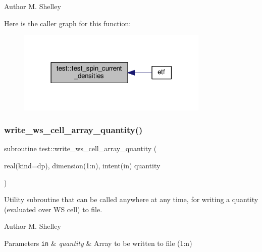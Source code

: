 \begin{DoxyAuthor}{Author}
M. Shelley 
\end{DoxyAuthor}
Here is the caller graph for this function\+:
\nopagebreak
\begin{figure}[H]
\begin{center}
\leavevmode
\includegraphics[width=259pt]{namespacetest_a3e49a3b6fd835efb13dd446bfb6e8b1f_icgraph}
\end{center}
\end{figure}
\mbox{\label{namespacetest_ae6399ba2e0d2b484e6b467b2cee74a1b}} 
\subsubsection{\texorpdfstring{write\+\_\+ws\+\_\+cell\+\_\+array\+\_\+quantity()}{write\_ws\_cell\_array\_quantity()}}
{\footnotesize\ttfamily subroutine test\+::write\+\_\+ws\+\_\+cell\+\_\+array\+\_\+quantity (\begin{DoxyParamCaption}\item[{real(kind=dp), dimension(1\+:n), intent(in)}]{quantity }\end{DoxyParamCaption})}



Utility subroutine that can be called anywhere at any time, for writing a quantity (evaluated over WS cell) to file. 

\begin{DoxyAuthor}{Author}
M. Shelley 
\end{DoxyAuthor}

\begin{DoxyParams}[1]{Parameters}
\mbox{\tt in}  & {\em quantity} & Array to be written to file (1\+:n) \\
\hline
\end{DoxyParams}



